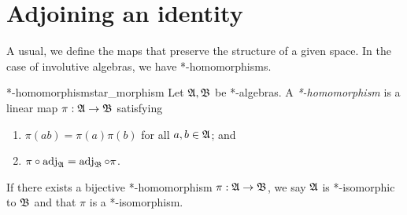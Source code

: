 \section{Adjoining an identity}
A usual, we define the maps that preserve the structure of a given space. In the case of involutive algebras, we have *-homomorphisms.
\begin{definition}{*-homomorphism}{star_morphism}
    Let \(\mathfrak{A}, \mathfrak{B}\) be *-algebras. A \emph{*-homomorphism} is a linear map \(\pi : \mathfrak{A} \to \mathfrak{B}\) satisfying
    \begin{enumerate}[label=(\alph*)]
        \item \(\pi(ab) = \pi(a) \pi(b)\) for all \(a, b \in \mathfrak{A}\); and
        \item \(\pi\circ \operatorname{adj}_{\mathfrak{A}} = \operatorname{adj}_{\mathfrak{B}}\circ \pi\).
    \end{enumerate}
    If there exists a bijective *-homomorphism \(\pi: \mathfrak{A} \to \mathfrak{B}\), we say \(\mathfrak{A}\) is *-isomorphic to \(\mathfrak{B}\) and that \(\pi\) is a *-isomorphism.
\end{definition}

